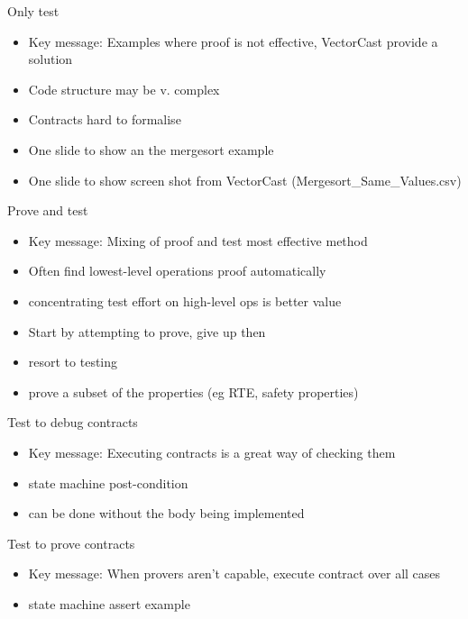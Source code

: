 \documentclass{beamer}
\begin{document}
\begin{frame}[fragile]{Only test}
  \begin{itemize}
     \item Key message: Examples where proof is not effective, VectorCast provide a solution
     \item Code structure may be v. complex
     \item Contracts hard to formalise
     \item One slide to show an the mergesort example
     \item One slide to show screen shot from VectorCast (Mergesort_Same_Values.csv)
  \end{itemize}
\end{frame}

\begin{frame}[fragile]{Prove and test}
  \begin{itemize}
     \item Key message: Mixing of proof and test most effective method
     \item Often find lowest-level operations proof automatically
     \item concentrating test effort on high-level ops is better value
     \item Start by attempting to prove, give up then
     \item resort to testing
     \item prove a subset of the properties (eg RTE, safety properties)
     
  \end{itemize}
\end{frame}

\begin{frame}[fragile]{Test to debug contracts}
  \begin{itemize}
     \item Key message: Executing contracts is a great way of checking them
     \item state machine post-condition
     \item can be done without the body being implemented
  \end{itemize}
\end{frame}

\begin{frame}[fragile]{Test to prove contracts}
  \begin{itemize}
     \item Key message: When provers aren't capable, execute contract over all cases
     \item state machine assert example
  \end{itemize}
\end{frame}
\end{document}
